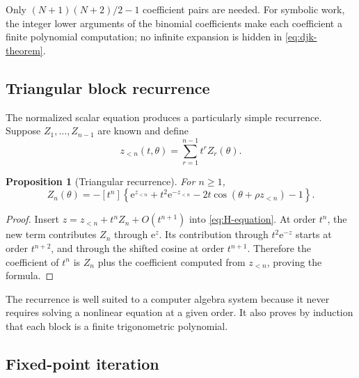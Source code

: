 \documentclass[11pt,oneside]{article}
\theoremstyle{plain}
\newtheorem{proposition}[theorem]{Proposition}
\theoremstyle{definition}
\theoremstyle{remark}
\newcommand{\e}{\mathrm{e}}
\begin{document}
Only \((N+1)(N+2)/2-1\) coefficient pairs are needed.  For symbolic work, the
integer lower arguments of the binomial coefficients make each coefficient a
finite polynomial computation; no infinite expansion is hidden in
\eqref{eq:djk-theorem}.

\subsection{Triangular block recurrence}

The normalized scalar equation produces a particularly simple recurrence.
Suppose \(Z_1,\ldots,Z_{n-1}\) are known and define
\begin{equation}
 z_{<n}(t,\theta)=\sum_{r=1}^{n-1}t^rZ_r(\theta).
 \label{eq:z-less-n}
\end{equation}

\begin{proposition}[Triangular recurrence]
\label{prop:triangular-recurrence}
For \(n\ge1\),
\begin{equation}
 \boxed{
 Z_n(\theta)=-[t^n]\left
 \{\e^{z_{<n}}+t^2\e^{-z_{<n}}
 -2t\cos(\theta+\rho z_{<n})-1\right\}.}
 \label{eq:Zn-recurrence}
\end{equation}
\end{proposition}

\begin{proof}
Insert
\(z=z_{<n}+t^nZ_n+O(t^{n+1})\) into \eqref{eq:H-equation}.  At order \(t^n\),
the new term contributes \(Z_n\) through \(\e^z\).  Its contribution through
\(t^2\e^{-z}\) starts at order \(t^{n+2}\), and through the shifted cosine at
order \(t^{n+1}\).  Therefore the coefficient of \(t^n\) is \(Z_n\) plus the
coefficient computed from \(z_{<n}\), proving the formula.
\end{proof}

The recurrence is well suited to a computer algebra system because it never
requires solving a nonlinear equation at a given order.  It also proves by
induction that each block is a finite trigonometric polynomial.

\subsection{Fixed-point iteration}
\end{document}
